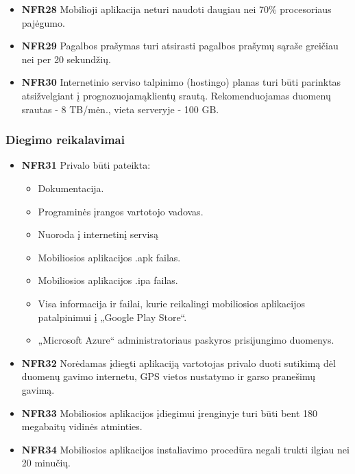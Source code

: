 \documentclass{VUMIFPSbakalaurinis}
\begin{document}
\begin{itemize}
	\item \textbf{NFR28} Mobilioji aplikacija neturi naudoti daugiau nei 70\% procesoriaus pajėgumo.
	\item \textbf{NFR29} Pagalbos prašymas turi atsirasti pagalbos prašymų sąraše greičiau nei per 20 sekundžių.
	\item \textbf{NFR30} Internetinio serviso talpinimo (hostingo) planas turi būti parinktas atsižvelgiant į prognozuojamąklientų srautą. Rekomenduojamas duomenų srautas - 8 TB/mėn., vieta serveryje - 100 GB.
\end{itemize}

\subsubsection{Diegimo reikalavimai}
\begin{itemize}
	\item \textbf{NFR31} Privalo būti pateikta:
	\begin{itemize}
		\item Dokumentacija.
		\item Programinės įrangos vartotojo vadovas.
		\item Nuoroda į internetinį servisą
		\item Mobiliosios aplikacijos .apk failas.
		\item Mobiliosios aplikacijos .ipa failas.
		\item Visa informacija ir failai, kurie reikalingi mobiliosios aplikacijos patalpinimui į „Google Play Store“.
		\item „Microsoft Azure“ administratoriaus paskyros prisijungimo duomenys.
	\end{itemize}
\end{itemize}

\begin{itemize}
	\item \textbf{NFR32} Norėdamas įdiegti aplikaciją vartotojas privalo duoti sutikimą dėl duomenų gavimo internetu, GPS vietos nustatymo ir garso pranešimų gavimą.
	\item \textbf{NFR33} Mobiliosios aplikacijos įdiegimui įrenginyje turi būti bent 180 megabaitų vidinės atminties.
	\item \textbf{NFR34} Mobiliosios aplikacijos instaliavimo procedūra negali trukti ilgiau nei 20 minučių.
\end{itemize}
\end{document}
